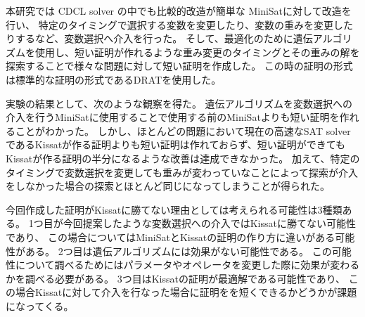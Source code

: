 本研究では CDCL solver の中でも比較的改造が簡単な MiniSat\cite{MINISAT}に対して改造を行い、
特定のタイミングで選択する変数を変更したり、変数の重みを変更したりするなど、変数選択へ介入を行った。
そして、最適化のために遺伝アルゴリズム\cite{GA}を使用し、短い証明が作れるような重み変更のタイミングとその重みの解を探索することで様々な問題に対して短い証明を作成した。
この時の証明の形式は標準的な証明の形式であるDRAT\cite{DRAT}を使用した。

実験の結果として、次のような観察を得た。
遺伝アルゴリズムを変数選択への介入を行うMiniSatに使用することで使用する前のMiniSatよりも短い証明を作れることがわかった。
しかし、ほとんどの問題において現在の高速なSAT solverであるKissatが作る証明よりも短い証明は作れておらず、短い証明ができてもKissatが作る証明の半分になるような改善は達成できなかった。
加えて、特定のタイミングで変数選択を変更しても重みが変わっていなことによって探索が介入をしなかった場合の探索とほとんど同じになってしまうことが得られた。

今回作成した証明がKissatに勝てない理由としては考えられる可能性は3種類ある。
1つ目が今回提案したような変数選択への介入ではKissatに勝てない可能性であり、
この場合についてはMiniSatとKissatの証明の作り方に違いがある可能性がある。
2つ目は遺伝アルゴリズムには効果がない可能性である。
この可能性について調べるためにはパラメータやオペレータを変更した際に効果が変わるかを調べる必要がある。
3つ目はKissatの証明が最適解である可能性であり、
この場合Kissatに対して介入を行なった場合に証明をを短くできるかどうかが課題になってくる。
